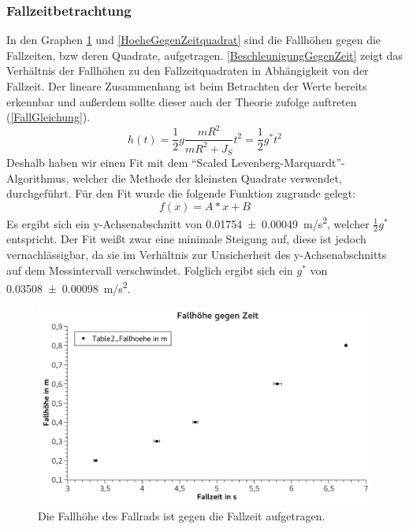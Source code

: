 \documentclass[
	a4paper,
	12pt,
	pagesize,
	ngerman
]{scrartcl}
\begin{document}
	\subsubsection*{Fallzeitbetrachtung}%
	In den Graphen \cref{HoeheGegenZeit} und \cref{HoeheGegenZeitquadrat} sind die Fallhöhen gegen die Fallzeiten, bzw deren Quadrate, aufgetragen.
	\cref{BeschleunigungGegenZeit} zeigt das Verhältnis der Fallhöhen zu den Fallzeitquadraten in Abhängigkeit von der Fallzeit.
	Der lineare Zusammenhang ist beim Betrachten der Werte bereits erkennbar und außerdem sollte dieser auch der Theorie zufolge auftreten (\cref{FallGleichung}).
	\begin{equation}
		h(t) = \frac{1}{2} g \frac{mR^2}{mR^2+J_S} t^2 = \frac{1}{2} g^* t^2
		\label{FallGleichung}
	\end{equation}
	Deshalb haben wir einen Fit mit dem \enquote{Scaled Levenberg-Marquardt}-Algorithmus, welcher die Methode der kleinsten Quadrate verwendet, durchgeführt.
	Für den Fit wurde die folgende Funktion zugrunde gelegt:
	\begin{equation}
		f(x)=A*x+B
	\end{equation}
	Es ergibt sich ein y-Achsenabschnitt von \SI{0,01754\pm 0,00049}{m/s^2}, welcher $\frac{1}{2}g^*$ entspricht. Der Fit weißt zwar eine minimale Steigung auf, diese ist jedoch vernachlässigbar, da sie im Verhältnis zur Unsicherheit des y-Achsenabschnitts auf dem Messintervall verschwindet. Folglich ergibt sich ein $g^*$ von \SI{0,03508 \pm 0,00098}{m/s^2}.
	\begin{figure}[tb]
		\includegraphics[width=1\textwidth]{HoeheGegenZeit}
		\centering
		\caption{Die Fallhöhe des Fallrads ist gegen die Fallzeit aufgetragen.}
		\label{HoeheGegenZeit}
		\centering
	\end{figure}
\end{document}
